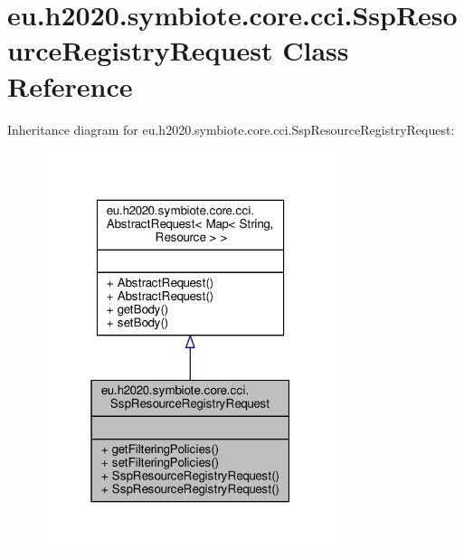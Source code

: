 \hypertarget{classeu_1_1h2020_1_1symbiote_1_1core_1_1cci_1_1SspResourceRegistryRequest}{}\section{eu.\+h2020.\+symbiote.\+core.\+cci.\+Ssp\+Resource\+Registry\+Request Class Reference}
\label{classeu_1_1h2020_1_1symbiote_1_1core_1_1cci_1_1SspResourceRegistryRequest}


Inheritance diagram for eu.\+h2020.\+symbiote.\+core.\+cci.\+Ssp\+Resource\+Registry\+Request\+:\nopagebreak
\begin{figure}[H]
\begin{center}
\leavevmode
\includegraphics[width=244pt]{classeu_1_1h2020_1_1symbiote_1_1core_1_1cci_1_1SspResourceRegistryRequest__inherit__graph}
\end{center}
\end{figure}


